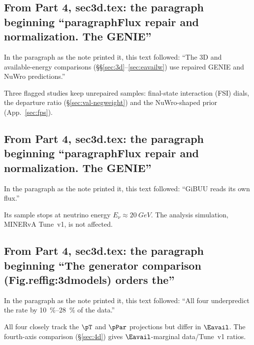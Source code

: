 \subsection{From Part 4, sec3d.tex: the paragraph beginning ``paragraphFlux repair and normalization. The GENIE''}
In the paragraph as the note printed it, this text followed: ``The 3D and available-energy comparisons (\S\S\ref{sec:3d}--\ref{sec:eavailw}) use repaired GENIE and NuWro predictions.''\par
Three flagged studies keep unrepaired samples: final-state interaction (FSI) dials, the departure ratio (\S\ref{sec:val-negweight}) and the NuWro-shaped prior (App.~\ref{sec:fps}).

\subsection{From Part 4, sec3d.tex: the paragraph beginning ``paragraphFlux repair and normalization. The GENIE''}
In the paragraph as the note printed it, this text followed: ``GiBUU reads its own flux.''\par
Its sample stops at neutrino energy $E_\nu\approx\SI{20}{GeV}$. The analysis simulation, MINERvA Tune~v1, is not affected.

\subsection{From Part 4, sec3d.tex: the paragraph beginning ``The generator comparison (Fig.reffig:3dmodels) orders the''}
In the paragraph as the note printed it, this text followed: ``All four underpredict the rate by \SIrange{10}{28}{\percent} of the data.''\par
All four closely track the $\pT$ and $\pPar$ projections but differ in $\Eavail$. The fourth-axis comparison (\S\ref{sec:4d}) gives $\Eavail$-marginal data/Tune~v1 ratios.

